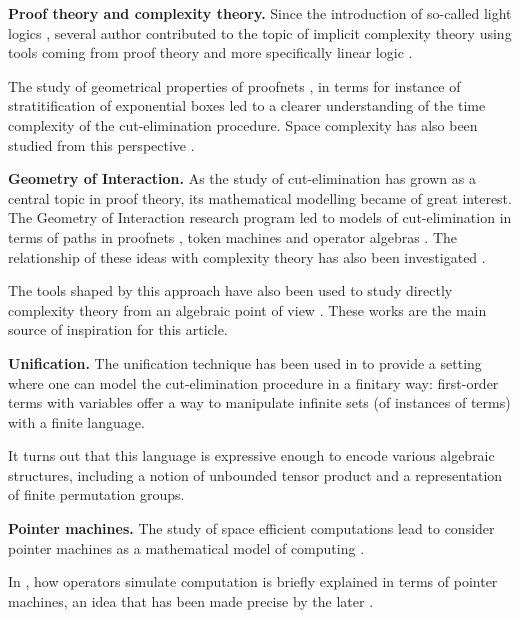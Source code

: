 \textbf{Proof theory and complexity theory.} Since the introduction of so-called light logics \cite{girard_light_1994}, several author contributed to the topic of implicit complexity theory using tools coming from proof theory and more specifically linear logic \cite{girard_linear_1987}.

The study of geometrical properties of proofnets \cite{girard_linear_1987}, in terms for instance of stratitification of exponential boxes \cite{baillot_linear_2010} led to a clearer understanding of the time complexity of the cut-elimination procedure. Space complexity has also been studied from this perspective \cite{schopp_stratified_2007,gaboardi_logical_2008}.

\smallskip\noindent
\textbf{Geometry of Interaction.} As the study of cut-elimination has grown as a central topic in proof theory, its mathematical modelling became of great interest. The Geometry of Interaction \cite{girard_towards_1989} research program led to models of cut-elimination in terms of paths in proofnets \cite{asperti_paths_1994}, token machines \cite{laurent_token_2001} and operator algebras \cite{girard_geometry_1989,girard_geometry_2005}.%
The relationship of these ideas with complexity theory has also been investigated \cite{schopp_space-efficient_2006,baillot_elementary_2001}.

The tools shaped by this approach have also been used to study directly complexity theory from an algebraic point of view \cite{girard_normativity_2012,aubert_characterizing_2012,seiller_logarithmic_2013}. These works are the main source of inspiration for this article.

\smallskip\noindent
\textbf{Unification.} The unification technique has been used in \cite{girard_geometry_1995,baillot_elementary_2001,girard_three_lightings} to provide a setting where one can model the cut-elimination procedure in a finitary way: first-order terms with variables offer a way to manipulate infinite sets (of instances of terms) with a finite language.

It turns out that this language is expressive enough to encode various algebraic structures, including a notion of unbounded tensor product and a representation of finite permutation groups.

\smallskip\noindent
\textbf{Pointer machines.} The study of space efficient computations lead to consider pointer machines as a mathematical model of computing \cite{hofmann_pointer_2009}.%

In \cite{girard_normativity_2012}, how operators simulate computation is briefly explained in terms of pointer machines, an idea that has been made precise by the later \cite{aubert_characterizing_2012,seiller_logarithmic_2013}.


